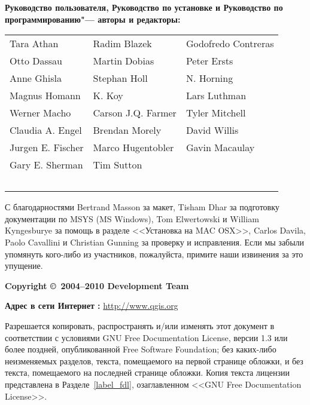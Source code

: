 \newpage

\begin{flushleft}
\textbf{Руководство пользователя, Руководство по установке и Руководство
по программированию"--- авторы и редакторы:}
  \par\bigskip\noindent
\begin{tabular}{p{4cm} p{4cm} p{4cm}}
Tara Athan & Radim Blazek & Godofredo Contreras \\
Otto Dassau & Martin Dobias & Peter Ersts \\
Anne Ghisla & Stephan Holl & N. Horning \\
Magnus Homann & K. Koy & Lars Luthman \\
Werner Macho & Carson J.Q. Farmer & Tyler Mitchell \\
Claudia A. Engel & Brendan Morely & David Willis \\
Jurgen E. Fischer & Marco Hugentobler & Gavin Macaulay \\
Gary E. Sherman & Tim Sutton \\ \
\end{tabular}
\end{flushleft}

С благодарностями Bertrand Masson за макет, Tisham Dhar за подготовку
документации по MSYS (MS Windows), Tom Elwertowski и William Kyngesburye
за помощь в разделе <<Установка на MAC OSX>>, Carlos Davila, Paolo
Cavallini и Christian Gunning за проверку и исправления. Если мы
забыли упомянуть кого-либо из участников, пожалуйста, примите наши
извинения за это упущение.
\par\bigskip\noindent
\textbf{Copyright \copyright~2004--2010 \QG Development Team}
\par\bigskip\noindent
\textbf{Адрес в сети Интернет :} \url{http://www.qgis.org}

\newpage


Разрешается копировать, распространять и/или изменять этот документ в
соответствии с условиями GNU Free Documentation License, версии 1.3 или
более поздней, опубликованной Free Software Foundation; без каких-либо
неизменяемых разделов, текста, помещаемого на первой странице обложки, и
без текста, помещаемого на последней странице обложки. Копия текста
лицензии представлена в Разделе~\ref{label_fdl}, озаглавленном <<GNU Free
Documentation License>>.

